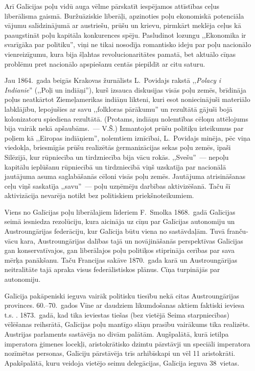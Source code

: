\documentclass[twoside,a5paper,12pt,fleqn,openany]{extbook}
\newcommand{\pltxti}[1]{\textit{\textpolish{#1}}}
\begin{document}
Arī Galīcijas poļu vidū auga vēlme pārskatīt iespējamos attīstības ceļus liberālisma gaismā. Buržuāziskie liberāļi, apzinoties poļu ekonomiskā potenciāla vājumu salīdzinājumā ar austriešu, prūšu un krievu, pirmkārt meklēja ceļus kā paaugstināt poļu kapitāla konkurences spēju. Pasludinot lozungu ,,Ekonomika ir svarīgāka par politiku'', viņi ne tikai nosodīja romantisko ideju par poļu nacionālo vienreizīgumu, kura bija šļahtas revolucionaritātes pamatā, bet aktuālo cīņas problēmu pret nacionālo apspiešanu centās piepildīt ar citu saturu.

Jau 1864.~gada beigās Krakovas žurnālists L.~Povidajs rakstā ,,\pltxti{Polacy i Indianie}'' (,,Poļi un indiāņi''), kurš izsauca diskusijas visās poļu zemēs, brīdināja poļus neatkārtot Ziemeļamerikas indiāņu likteni, kuri esot noniecinājuši materiālo labklājību, lepojušies ar savu ,,folkloras pārākumu'' un rezultātā gājuši bojā kolonizatoru spiediena rezultātā. (Protams, indiāņu nolemtības cēloņu attēlojums bija vairāk nekā apšaubāms.~--- V.Š.) Izmantojot prūšu politiķu izteikumus par poļiem kā ,,Eiropas indiāņiem'', nolemtiem iznīcībai, L.~Povidajs minēja, pēc viņa viedokļa, briesmīgās prūšu realizētās ģermanizācijas sekas poļu zemēs, īpaši Silēzijā, kur rūpniecība un tirdzniecība bija vācu rokās. ,,Svešu''~--- nepoļu kapitālu ieplūšanu rūpniecībā un tirdzniecībā viņš uzskatīja par nacionālā jautājuma asuma saglabāšanās cēloni visās poļu zemēs. Jautājuma atrisināšanas ceļu viņš saskatīja ,,savu''~--- poļu uzņēmēju darbības aktivizēšanā. Taču šī aktivizācija nevarēja notikt bez politiskiem priekšnoteikumiem.

Viens no Galīcijas poļu liberālajiem līderiem F.~Smolka 1868.~gadā Galīcijas seimā iesniedza rezolūciju, kura aicināja uz cīņu par Galīcijas autonomiju un Austroungārijas federāciju, kur Galīcija būtu viena no sastāvdaļām. Tuvā franču-vācu kara, Austroungārijas dalības tajā un novājināšanās perspektīvas Galīcijas gan konservatīvajos, gan liberālajos poļu politiķos stiprināja cerības par sava mērķa panākšanu. Taču Francijas sakāve 1870.~gada karā un Austroungārijas neitralitāte tajā apraka visus federālistiskos plānus. Cīņa turpinājās par autonomiju.

Galīcija pakāpeniski ieguva vairāk politisku tiesību nekā citas Austroungārijas provinces. 60.--70.~gados Vīne ar daudziem likumdošanas aktiem faktiski ieviesa t.s. . 1873.~gadā, kad tika ieviestas tiešas (bez vietējā Seima starpniecības) vēlēšanas reihsrātā, Galīcijas poļu mantīgo slāņu prasību vairākums tika realizēts. Austrijas parlaments sastāvēja no divām palātām. Augšpalātā, kurā ietilpa imperatora ģimenes locekļi, aristokrātisko dzimtu pārstāvji un speciāli imperatora nozīmētas personas, Galīciju pārstāvēja trīs arhibīskapi un vēl 11 aristokrāti. Apakšpalātā, kuru veidoja vietējo seimu delegācijas, Galīcija ieguva 38~vietas.
\end{document}
